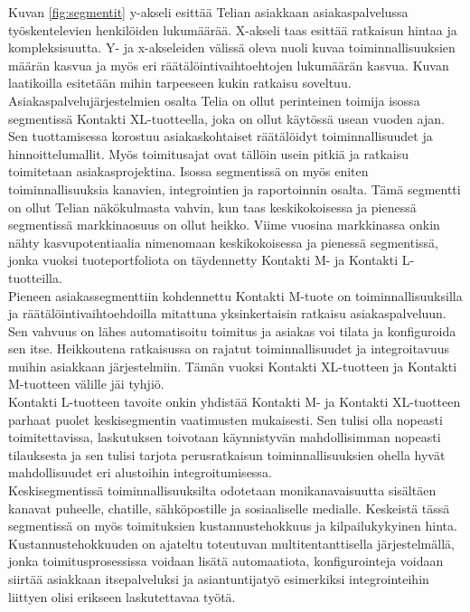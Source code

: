 \documentclass[finnish,12pt,a4paper,pdftex]{article}
\begin{document}
Kuvan \ref{fig:segmentit} y-akseli esittää Telian asiakkaan asiakaspalvelussa työskentelevien henkilöiden lukumäärää. X-akseli taas esittää ratkaisun hintaa ja kompleksisuutta. Y- ja x-akseleiden välissä oleva nuoli kuvaa toiminnallisuuksien määrän kasvua ja myös eri räätälöintivaihtoehtojen lukumäärän kasvua. Kuvan laatikoilla esitetään mihin tarpeeseen kukin ratkaisu soveltuu.\\

\noindent Asiakaspalvelujärjestelmien osalta Telia on ollut perinteinen toimija isossa segmentissä Kontakti XL-tuotteella, joka on ollut käytössä usean vuoden ajan. Sen tuottamisessa korostuu asiakaskohtaiset räätälöidyt toiminnallisuudet ja hinnoittelumallit. Myös toimitusajat ovat tällöin usein pitkiä ja ratkaisu toimitetaan asiakasprojektina. Isossa segmentissä on myös eniten toiminnallisuuksia kanavien, integrointien ja raportoinnin osalta. Tämä segmentti on ollut Telian näkökulmasta vahvin, kun taas keskikokoisessa ja pienessä segmentissä markkinaosuus on ollut heikko. Viime vuosina markkinassa onkin nähty kasvupotentiaalia nimenomaan keskikokoisessa ja pienessä segmentissä, jonka vuoksi tuoteportfoliota on täydennetty Kontakti M- ja Kontakti L-tuotteilla.\\

\noindent Pieneen asiakassegmenttiin kohdennettu Kontakti M-tuote on toiminnallisuuksilla ja räätälöintivaihtoehdoilla mitattuna yksinkertaisin ratkaisu asiakaspalveluun. Sen vahvuus on lähes automatisoitu toimitus ja asiakas voi tilata ja konfiguroida sen itse. Heikkoutena ratkaisussa on rajatut toiminnallisuudet ja integroitavuus muihin asiakkaan järjestelmiin. Tämän vuoksi Kontakti XL-tuotteen ja Kontakti M-tuotteen välille jäi tyhjiö.\\

Kontakti L-tuotteen tavoite onkin yhdistää Kontakti M- ja Kontakti XL-tuotteen parhaat puolet keskisegmentin vaatimusten mukaisesti. Sen tulisi olla nopeasti toimitettavissa, laskutuksen toivotaan käynnistyvän mahdollisimman nopeasti tilauksesta ja sen tulisi tarjota perusratkaisun toiminnallisuuksien ohella hyvät mahdollisuudet eri alustoihin integroitumisessa.\\

Keskisegmentissä toiminnallisuuksilta odotetaan monikanavaisuutta sisältäen kanavat puheelle, chatille, sähköpostille ja sosiaaliselle medialle. Keskeistä tässä segmentissä on myös toimituksien kustannustehokkuus ja kilpailukykyinen hinta. Kustannustehokkuuden on ajateltu toteutuvan multitentanttisella järjestelmällä, jonka toimitusprosessissa voidaan lisätä automaatiota, konfigurointeja voidaan siirtää asiakkaan itsepalveluksi ja asiantuntijatyö esimerkiksi integrointeihin liittyen olisi erikseen laskutettavaa työtä.\\
\end{document}
